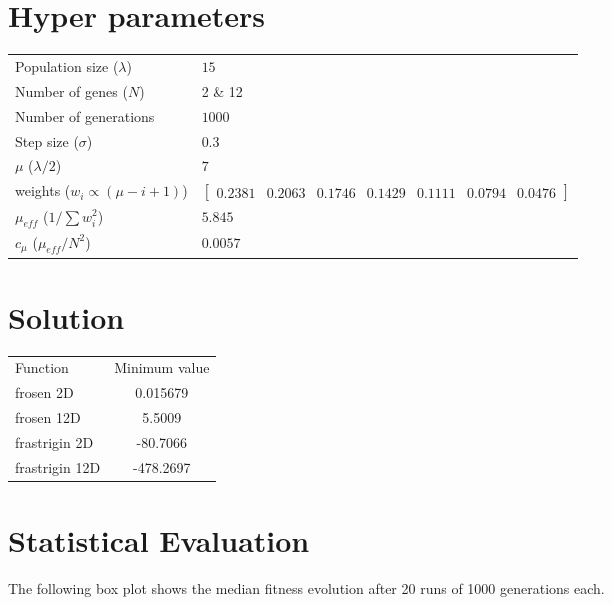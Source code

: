 \documentclass[paper=a4, fontsize=11pt]{scrartcl} %
\title{\hmwkClass \\
       \hmwkTitle}
\author{\hmwkAuthorFullName}
\date{\hmwkDueDate}
\begin{document}
    \maketitle
    \thispagestyle{fancy}

\section{Hyper parameters}

    \begin{tabular}{ll}
        Population size ($\lambda$) & $15$ \\
        Number of genes ($N$)       & 2 \& 12 \\
        Number of generations       & $1000$ \\
        Step size ($\sigma$)        & $0.3$ \\
        $\mu$ ($\lambda / 2$)       & $7$ \\
        weights ($w_i \propto (\mu - i + 1)$)
        & $\left[ \begin{matrix}
        0.2381 & 0.2063 & 0.1746 & 0.1429 & 0.1111 & 0.0794 & 0.0476
        \end{matrix} \right]$ \\
        $\mu_{eff}$ ($1 / \sum w_i^2$)
        & $5.845$ \\
        $c_\mu$ ($\mu_{eff} / N^2$) & $0.0057$ \\
    \end{tabular}


    \section{Solution}
    \begin{tabular}{p{5cm}c}
        Function & Minimum value\\
        frosen 2D & 0.015679 \\
        frosen 12D & 5.5009 \\
        frastrigin 2D & -80.7066 \\
        frastrigin 12D & -478.2697 \\
    \end{tabular}


    \section{Statistical Evaluation}

    The following box plot shows the median fitness evolution after 20 runs of 1000 generations each.
\end{document}
